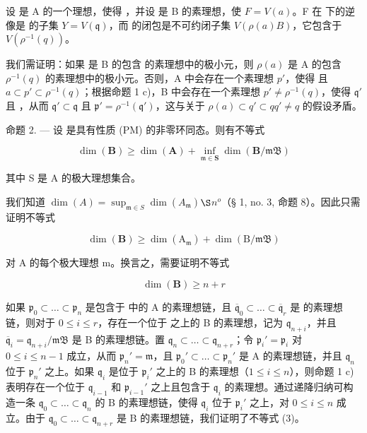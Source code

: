 设  是 A 的一个理想，使得  ，并设  是 B 的素理想，使 \(F = V(a)\)。F 在  下的逆像是  的子集 \(Y = V(\mathfrak{q})\)，而  的闭包是不可约闭子集 \(V(\rho(a)B)\)，它包含于 \(V(\rho^{-1}(q))\)。

我们需证明：如果  是 B 的包含  的素理想中的极小元，则 \(\rho(a)\) 是 A 的包含 \(\rho^{-1}(q)\) 的素理想中的极小元。否则，A 中会存在一个素理想 \(p'\)，使得  且 \(a \subset p' \subset \rho^{-1}(q)\)；根据命题 1 c)，B 中会存在一个素理想 \(p' \neq \rho^{-1}(q)\)，使得 \(\mathfrak{q}'\) 且 ，从而 \(\mathfrak{q}' \subset \mathfrak{q}\) 且 \(\mathfrak{p}' = \rho^{-1}(\mathfrak{q}')\)，这与关于 \(\rho(a) \subset q' \subset q\)\(q' \neq q\) 的假设矛盾。

命题 2. --- 设  是具有性质 (PM) 的非零环同态。则有不等式

\[
\dim (\mathbf {B}) \geqslant \dim (\mathbf {A}) + \inf _ {\mathfrak {m} \in \mathbf {S}} \dim (\mathbf {B} / \mathfrak {m B})\tag{1}
\]

其中 S 是 A 的极大理想集合。

我们知道 \(\dim(A) = \sup_{\mathfrak m \in S} \dim(A_{\mathfrak m})\)\(\S\)\(n^o\)（§ 1, no. 3, 命题 8）。因此只需证明不等式

\[
\dim (\mathbf {B}) \geqslant \dim (\mathrm{A} _ {\mathfrak {m}}) + \dim (\mathrm{B} / \mathfrak {m B})\tag{2}
\]

对 A 的每个极大理想 m。换言之，需要证明不等式

\[
\dim (\mathbf {B}) \geqslant n + r\tag{3}
\]

如果 \(\mathfrak{p}_0\subset \ldots \subset \mathfrak{p}_n\) 是包含于  中的 A 的素理想链，且 \(\overline{\mathfrak{q}}_0\subset \ldots \subset \overline{\mathfrak{q}}_r\) 是  的素理想链，则对于 \(0\leqslant i\leqslant r\)，存在一个位于  之上的 B 的素理想，记为 \(\mathfrak{q}_{n+i}\)，并且 \(\overline{\mathfrak{q}}_i = \mathfrak{q}_{n + i} / \mathfrak{mB}\) 是 B 的素理想链。置 \(\mathfrak{q}_n\subset \ldots \subset \mathfrak{q}_{n + r}\)；令 \(\mathfrak{p}_i' = \mathfrak{p}_i\) 对 \(0\leqslant i\leqslant n-1\) 成立，从而 \(\mathfrak{p}_n' = \mathfrak m\)，且 \(\mathfrak{p}_0'\subset \ldots \subset \mathfrak{p}_n'\) 是 A 的素理想链，并且 \(\mathfrak{q}_n\) 位于 \(\mathfrak{p}_n'\) 之上。如果 \(\mathfrak{q}_i\) 是位于 \(\mathfrak{p}_i'\) 之上的 B 的素理想（\(1\leqslant i\leqslant n\)），则命题 1 c) 表明存在一个位于 \(\mathfrak{q}_{i-1}\) 和 \(\mathfrak{p}_{i-1}'\) 之上且包含于 \(\mathfrak{q}_i\) 的素理想。通过递降归纳可构造一条 \(\mathfrak{q}_0\subset \ldots \subset \mathfrak{q}_n\) 的 B 的素理想链，使得 \(\mathfrak{q}_i\) 位于 \(\mathfrak{p}_i'\) 之上，对 \(0\leqslant i\leqslant n\) 成立。由于 \(\mathfrak{q}_0\subset \ldots \subset \mathfrak{q}_{n+r}\) 是 B 的素理想链，我们证明了不等式 (3)。


